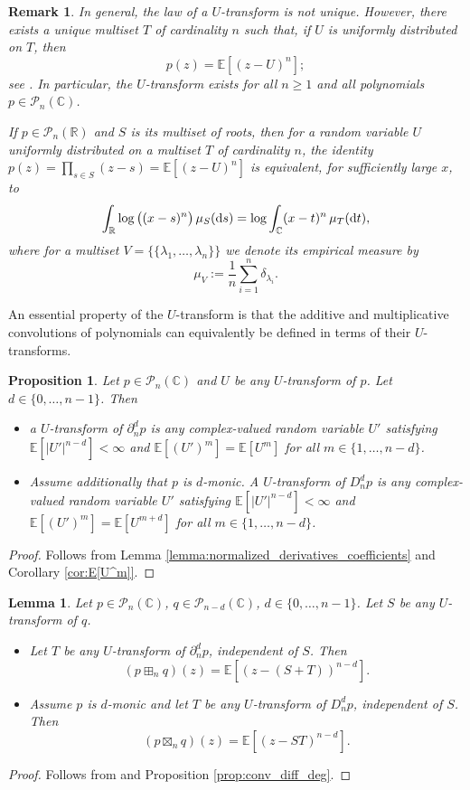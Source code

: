 \documentclass[a4paper,11pt]{amsart}
\numberwithin{equation}{section}
\newtheorem{lemma}[theorem]{Lemma}
\newtheorem{proposition}[theorem]{Proposition}
\newtheorem{remark}[theorem]{Remark}
\newcommand{\C}{\mathbb{C}}
\newcommand{\E}{\mathbb{E}}
\newcommand{\R}{\mathbb{R}}
\newcommand{\dt}{{\rm d} t}
\newcommand{\pols}{\mathcal P}
\newcommand{\mset}[1]{%
  \{\!\!\{ #1 \}\!\!\}%
}
\begin{document}
\begin{remark}\label{rem:MK}
In general, the law of a $U$-transform is not unique. However, there exists a unique multiset $T$ of cardinality $n$ such that, if $U$ is uniformly distributed on $T$, then
\[
p(z)=\E[(z-U)^n];
\]
see \cite[Lemma 3.1]{Mar21}. In particular, the $U$-transform exists for all $n\ge 1$ and all polynomials $p\in\pols_n(\C)$.

If $p\in\pols_n(\R)$ and $S$ is its multiset of roots, then for a random variable $U$ uniformly distributed on a multiset $T$ of cardinality $n$, the identity
$p(z)=\prod_{s\in S}(z-s)=\E[(z-U)^n]$ 
is equivalent, for sufficiently large $x$, to
\[
\int_{\R} \log\big((x-s)^n\big)\,\mu_S({\rm d}s)
=
\log \int_{\C} (x-t)^n\,\mu_T(\dt),
\]
where for a multiset $V=\mset{\lambda_1,\dots,\lambda_n}$ we denote its empirical measure by
\[
\mu_V:=\frac1n\sum_{i=1}^n\delta_{\lambda_i}.
\]
\end{remark}


An essential property of the $U$-transform is that the additive and multiplicative convolutions of polynomials can equivalently be defined in terms of their $U$-transforms. 

\begin{proposition}
    Let $p\in\pols_n(\C)$ and $U$ be any $U$-transform of $p$. Let $d\in\{0,\dots,n-1\}$. Then 
\begin{itemize}
    \item[(i)] a $U$-transform of $\partial_n^dp$ is any complex-valued random variable $U'$ satisfying $\E[|U'|^{n-d}]<\infty$ and $\E[(U')^m]=\E[U^m]$ for all $m\in\{1,\dots,n-d\}$.
    \item[(ii)] Assume additionally that $p$ is $d$-monic. A $U$-transform of $D_n^dp$ is any complex-valued random variable $U'$ satisfying $\E[|U'|^{n-d}]<\infty$ and $\E[(U')^m]=\E[U^{m+d}]$ for all $m\in\{1,\dots,n-d\}$.
\end{itemize}
\end{proposition}
\begin{proof}
    Follows from Lemma \ref{lemma:normalized_derivatives_coefficients} and Corollary \ref{cor:E[U^m]}.
\end{proof}


\begin{lemma}\label{lem:U_transf_finite_free_conv}
    Let $p\in\pols_{n}(\C)$, $q\in\pols_{n-d}(\C)$, $d\in\{0,\ldots,n-1\}$. Let $S$ be any $U$-transform of $q$. 
\begin{itemize}
    \item[(i)] Let $T$ be any $U$-transform of $\partial_n^d p$, independent of $S$. Then
    \[
    ( p \boxplus_{n} q )(z) 
= \E[(z - (S+T))^{n-d}].
    \]
    \item[(ii)] Assume $p$ is $d$-monic and let $T$ be any $U$-transform of $D_n^d p$, independent of $S$. Then
    \[
    ( p \boxtimes_{n} q )(z) 
= \E[(z - S T)^{n-d}].
    \]
\end{itemize}
\end{lemma}
\begin{proof}
    Follows from \cite[Lemma 3.4]{Mar21} and Proposition \ref{prop:conv_diff_deg}.
\end{proof}
\end{document}
